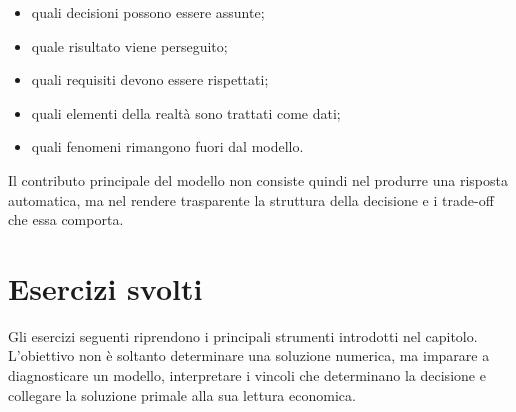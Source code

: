 \begin{itemize}

\item quali decisioni possono essere assunte;

\item quale risultato viene perseguito;

\item quali requisiti devono essere rispettati;

\item quali elementi della realt\`a sono trattati come dati;

\item quali fenomeni rimangono fuori dal modello.

\end{itemize}

Il contributo principale del modello non consiste quindi nel produrre una
risposta automatica, ma nel rendere trasparente la struttura della decisione e
i trade-off che essa comporta.

\section{Esercizi svolti}

\label{sec:cap11-esercizi-svolti}

Gli esercizi seguenti riprendono i principali strumenti introdotti nel
capitolo. L'obiettivo non \`e soltanto determinare una soluzione numerica, ma
imparare a diagnosticare un modello, interpretare i vincoli che determinano
la decisione e collegare la soluzione primale alla sua lettura economica.

